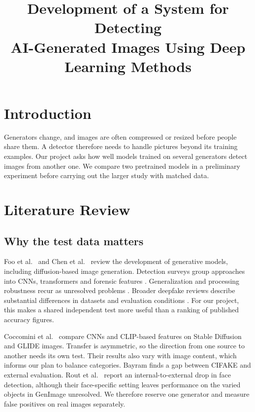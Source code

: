 \documentclass[pdflatex]{sn-jnl}
\begin{document}
\raggedbottom
\nocite{foo2025,chen2025,zhang2025,mahara2026,coccomini2024,bayram2026,xu2026,deng2026,pei2026,heidari2024,singh2025,shahzad2022,lamichhane2025,saskoro2024,man2026,yumlembam2025,yinghua2026,rout2026,yu2025,scadet2025,sanders2026,he2016,radford2021,wang2020,ojha2023,genimage2023,grommelt2025}
\title{Development of a System for Detecting\\AI-Generated Images Using Deep Learning Methods}
\author*{ }
\author*{ }
\maketitle

\section{Introduction}
Generators change, and images are often compressed or resized before people share them. A detector therefore needs to handle pictures beyond its training examples. Our project asks how well models trained on several generators detect images from another one. We compare two pretrained models in a preliminary experiment before carrying out the larger study with matched data.

\section{Literature Review}
\subsection{Why the test data matters}
Foo et al.\ \citep{foo2025} and Chen et al.\ \citep{chen2025} review the development of generative models, including diffusion-based image generation. Detection surveys group approaches into CNNs, transformers and forensic features \citep{zhang2025,mahara2026}. Generalization and processing robustness recur as unresolved problems \citep{xu2026,deng2026}. Broader deepfake reviews describe substantial differences in datasets and evaluation conditions \citep{pei2026,heidari2024,singh2025,shahzad2022}. For our project, this makes a shared independent test more useful than a ranking of published accuracy figures.

Coccomini et al.\ \citep{coccomini2024} compare CNNs and CLIP-based features on Stable Diffusion and GLIDE images. Transfer is asymmetric, so the direction from one source to another needs its own test. Their results also vary with image content, which informs our plan to balance categories. Bayram \citep{bayram2026} finds a gap between CIFAKE and external evaluation. Rout et al.\ \citep{rout2026} report an internal-to-external drop in face detection, although their face-specific setting leaves performance on the varied objects in GenImage unresolved. We therefore reserve one generator and measure false positives on real images separately.
\end{document}
